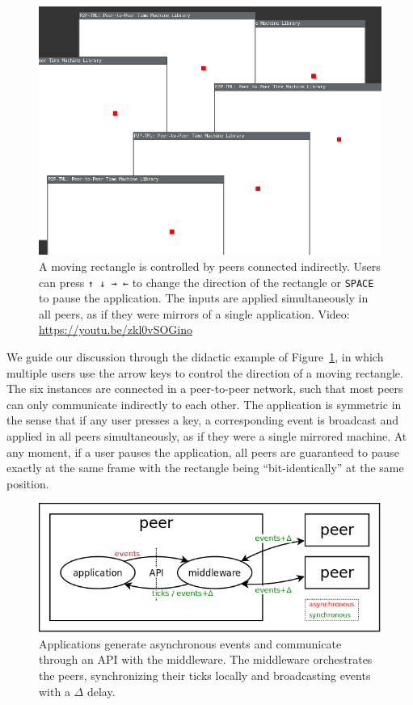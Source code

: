 \documentclass[fleqn,10pt]{SelfArx}
\newcommand{\code}[1]  {\texttt{\footnotesize{#1}}}
\begin{document}
\begin{figure}
    \centering
    \includegraphics[width=\linewidth]{move}
    \caption[XXX] {
        A moving rectangle is controlled by peers connected indirectly.
        Users can press \code{↑ ↓ → ←} to change the direction of the
        rectangle or \code{SPACE} to pause the application.
        The inputs are applied simultaneously in all peers, as if they were
        mirrors of a single application.
        Video: \url{https://youtu.be/zkl0vSOGino}
        \label{fig.move}
    }
\end{figure}

We guide our discussion through the didactic example of Figure~\ref{fig.move},
in which multiple users use the arrow keys to control the direction of a
moving rectangle.
The six instances are connected in a peer-to-peer network, such that most
peers can only communicate indirectly to each other.
%
The application is symmetric in the sense that if any user presses a key, a
corresponding event is broadcast and applied in all peers simultaneously, as
if they were a single mirrored machine.
At any moment, if a user pauses the application, all peers are guaranteed to
pause exactly at the same frame with the rectangle being ``bit-identically'' at
the same position.

\begin{figure}
  \centering
  \includegraphics[width=\linewidth]{middleware}
  \caption{
    Applications generate asynchronous events and communicate through an API
    with the middleware.
    The middleware orchestrates the peers, synchronizing their ticks locally
    and broadcasting events with a $\Delta$ delay.
    \label{fig.middleware}
  }
\end{figure}
\end{document}

